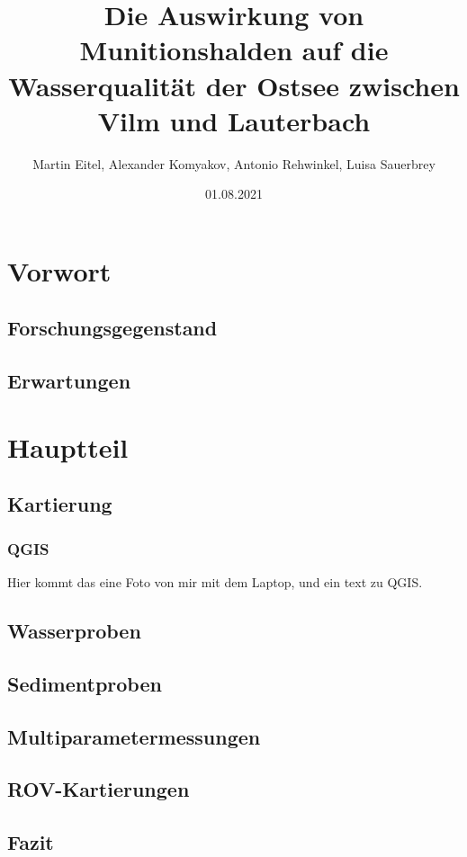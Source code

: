 \documentclass[12pt,titlepage]{scrbook}
\begin{document}
\begin{titlepage}
\title{Die Auswirkung von Munitionshalden auf die Wasserqualität der Ostsee zwischen Vilm und Lauterbach}
\date{01.08.2021}
\author{Martin Eitel, Alexander Komyakov, Antonio Rehwinkel, Luisa Sauerbrey}
\maketitle
\end{titlepage}
\tableofcontents
\chapter{Vorwort}
\section{Forschungsgegenstand}
\section{Erwartungen}
\chapter{Hauptteil}
\section{Kartierung}
    \subsection*{QGIS}
    Hier kommt das eine Foto von mir mit dem Laptop, und ein text zu QGIS.
    
\section{Wasserproben}
\section{Sedimentproben}
\section{Multiparametermessungen}
\section{ROV-Kartierungen}
\section{Fazit}
\end{document}
